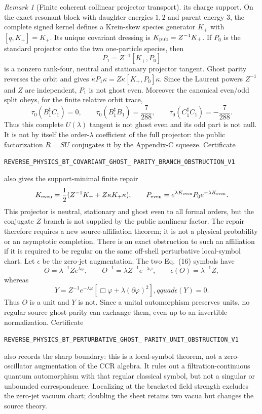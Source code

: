 \documentclass[11pt]{article}
\theoremstyle{definition}
\theoremstyle{remark}
\newtheorem{remark}[theorem]{Remark}
\begin{document}
\begin{remark}[Finite coherent collinear projector transport]
its charge support.  On the exact resonant block with daughter
energies $1,2$ and parent energy $3$, the complete signed kernel defines a
Krein-skew species generator $K_+$ with $[q,K_+]=K_+$.  Its unique covariant
dressing is $K_{\rm pub}=Z^{-1}K_+$.  If $P_0$ is the standard projector onto
the two one-particle species, then
\[
 P_1=Z^{-1}[K_+,P_0]
\]
is a nonzero rank-four, neutral and stationary projector tangent.  Ghost
parity reverses the orbit and gives
$\kappa P_1\kappa=Z\kappa[K_+,P_0]\kappa$.  Since the Laurent powers
$Z^{-1}$ and $Z$ are independent, $P_1$ is not ghost even.  Moreover the
canonical even/odd split obeys, for the finite relative orbit trace,
\[
 \tau_0(B_1^\sharp C_1)=0,\qquad
 \tau_0(B_1^\sharp B_1)=\frac7{288},\qquad
 \tau_0(C_1^\sharp C_1)=-\frac7{288}.
\]
Thus this complete $U(\lambda)$ tangent is not ghost even and its odd part is
not null.  It is not by itself the order-$\lambda$ coefficient of the full
projector: the public factorization $R=S U$ conjugates it by the Appendix-C
squeeze.  Certificate
\par\noindent
\texttt{REVERSE\_PHYSICS\_BT\_COVARIANT\_GHOST\_}
\allowbreak\texttt{PARITY\_BRANCH\_OBSTRUCTION\_V1}
\par\noindent
also gives the support-minimal finite repair
\[
 K_{\rm even}=\frac12
 (Z^{-1}K_++Z\kappa K_+\kappa),\qquad
 P_{\rm even}=e^{\lambda K_{\rm even}}P_0e^{-\lambda K_{\rm even}}.
\]
This projector is neutral, stationary and ghost even to all formal orders,
but the conjugate $Z$ branch is not supplied by the public nonlinear factor.
The
repair therefore requires a new source-affiliation theorem; it is not a
physical probability or an asymptotic completion.
There is an exact obstruction to such an affiliation if it is required to be
regular on the same off-shell perturbative local-symbol chart.  Let
$\epsilon$ be the zero-jet augmentation.  The two Eq.~(16) symbols have
\[
 O=\lambda^{-1}Ze^{\lambda\varphi},\qquad
 O^{-1}=\lambda Z^{-1}e^{-\lambda\varphi},\qquad
 \epsilon(O)=\lambda^{-1}Z,
\]
whereas
\[
 Y=Z^{-1}e^{-\lambda\varphi}
 [\Box\varphi+\lambda(\partial\varphi)^2],qquad
 \epsilon(Y)=0.
\]
Thus $O$ is a unit and $Y$ is not.  Since a unital automorphism preserves
units, no regular source ghost parity can exchange them, even up to an
invertible normalization.  Certificate
\par\noindent
\texttt{REVERSE\_PHYSICS\_BT\_PERTURBATIVE\_GHOST\_}
\allowbreak\texttt{PARITY\_UNIT\_OBSTRUCTION\_V1}
\par\noindent
also records the sharp boundary: this is a local-symbol theorem, not a
zero-oscillator augmentation of the CCR algebra.  It rules out a
filtration-continuous quantum automorphism with that regular classical
symbol, but not a singular or unbounded correspondence.  Localizing at the
bracketed field strength excludes the zero-jet vacuum chart; doubling the
sheet retains two vacua but changes the source theory.


\end{remark}
\end{document}
